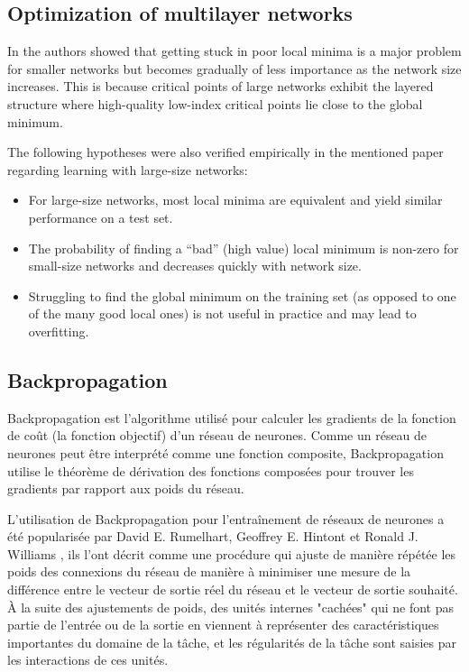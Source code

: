\subsection{Optimization of multilayer networks}
In  \cite{Choromanska2014} the authors showed that getting stuck in poor local minima is a major problem for smaller networks but becomes gradually of less importance as the network size increases. This is because critical points of large networks exhibit the layered structure where high-quality low-index critical points lie close to the global minimum.

The following hypotheses were also verified empirically in the mentioned paper regarding learning with large-size networks:
\begin{itemize}
    \item For large-size networks, most local minima are equivalent and yield similar performance on a test set.
    \item The probability of finding a “bad” (high value) local minimum is non-zero for small-size networks and decreases quickly with network size.
    \item Struggling to find the global minimum on the training set (as opposed to one of the many good local ones) is not useful in practice and may lead to overfitting.
\end{itemize}

\subsection{Backpropagation}
Backpropagation est l'algorithme utilisé pour calculer les gradients de la fonction de coût (la fonction objectif) d'un réseau de neurones. Comme un réseau de neurones peut être interprété comme une fonction composite, Backpropagation utilise le théorème de dérivation des fonctions composées
pour trouver les gradients par rapport aux poids du réseau.

L'utilisation de Backpropagation pour l'entraînement de réseaux de neurones a été popularisée par David E. Rumelhart, Geoffrey E. Hintont et Ronald J. Williams \cite{Rumelhart1986}, ils l'ont décrit comme une procédure qui ajuste de manière répétée les poids des connexions du réseau de manière à minimiser une mesure de la différence entre le vecteur de sortie réel du réseau et le vecteur de sortie souhaité. À la suite des ajustements de poids, des unités internes "cachées" qui ne font pas partie de l'entrée ou de la sortie en viennent à représenter des caractéristiques importantes du domaine de la tâche, et les régularités de la tâche sont saisies par les interactions de ces unités.

